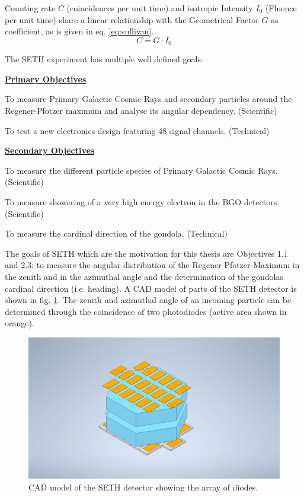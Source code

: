 Counting rate $C$ (coincidences per unit time) and isotropic Intensity $I_0$ (Fluence per unit time) share a linear relationship with the Geometrical Factor $G$ as coefficient, as is given in eq. \eqref{eq:sullivan}\cite{SULLIVAN19715}.
\begin{equation}
    C=G\cdot I_0
    \label{eq:sullivan}
\end{equation}

\newpage
The \ac{SETH} experiment has multiple well defined goals:

    \underline{\textbf{Primary Objectives}}
		\begin{description}\setlength\itemsep{-1em}
			\item[Obj. 1.1:] To measure Primary Galactic Cosmic Rays and secondary particles around the Regener-Pfotzer maximum and analyse its angular dependency. (Scientific)
			\item[Obj. 1.2:] To test a new electronics design featuring 48 signal channels. (Technical)
		\end{description}
	\underline{\textbf{Secondary Objectives}}
		\begin{description}\setlength\itemsep{-1em}
			\item[Obj. 2.1:] To measure the different particle species of Primary Galactic Cosmic Rays. (Scientific)
            \item[Obj. 2.2:] To measure showering of a very high energy electron in the \ac{BGO} detectors. (Scientific)
            \item[Obj. 2.3:] To measure the cardinal direction of the gondola. (Technical)
		\end{description}

The goals of \ac{SETH} which are the motivation for this thesis are Objectives 1.1 and 2.3: to measure the angular distribution of the Regener-Pfotzer-Maximum in the zenith and in the azimuthal angle and the determination of the gondolas cardinal direction (i.e. heading). A \ac{CAD} model of parts of the \ac{SETH} detector is shown in fig. \ref{fig:seth_cad}. The zenith and azimuthal angle of an incoming particle can be determined through the coincidence of two photodiodes (active area shown in orange).

\begin{figure}[H]
    \centering
    \includegraphics[width=0.5\linewidth, trim = {5cm 0cm 5cm 0cm}, clip]{images/01_background/SETH-Sketch.jpeg}
    \caption[\ac{SETH} detector sketch]{\ac{CAD} model of the \ac{SETH} detector showing the array of diodes.}
    \label{fig:seth_cad}
\end{figure}

